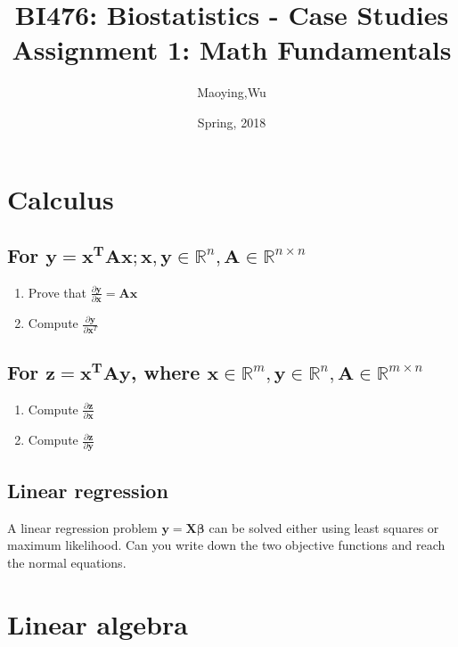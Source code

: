 \documentclass[11pt,a4paper]{article}
\title{\small{BI476: Biostatistics - Case Studies}\\
\Large{Assignment 1: Math Fundamentals}
}
\author{Maoying,Wu}
\date{Spring, 2018}
\begin{document}
\begin{CJK*}{UTF8}{gbsn}
\maketitle

\section{Calculus}
\subsection{For $\mathbf{y=x^T A x}; \mathbf{x, y} \in \mathbb{R}^n, \mathbf{A} \in 
\mathbb{R}^{n \times n}$}
\begin{enumerate}[(1)]
    \item Prove that $\frac{\partial \mathbf{y}}{\partial \mathbf{x}} = \mathbf{Ax}$
    \item Compute $\frac{\partial \mathbf{y}}{\partial \mathbf{x}^T}$
\end{enumerate}

\subsection{For $\mathbf{z=x^TAy}$, where $\mathbf{x} \in \mathbb{R}^m, \mathbf{y} 
\in \mathbb{R}^n, \mathbf{A} \in \mathbb{R}^{m \times n}$}
\begin{enumerate}[(1)]
    \item Compute $\frac{\partial \mathbf{z}}{\partial \mathbf{x}}$
    \item Compute $\frac{\partial \mathbf{z}}{\partial \mathbf{y}}$
\end{enumerate}

\subsection{Linear regression}
A linear regression problem $\mathbf{y = X\beta}$ can be solved 
either using least squares or maximum likelihood. Can you write down the two 
objective functions and reach the normal equations.


\section{Linear algebra}

\end{CJK*}
\end{document}

